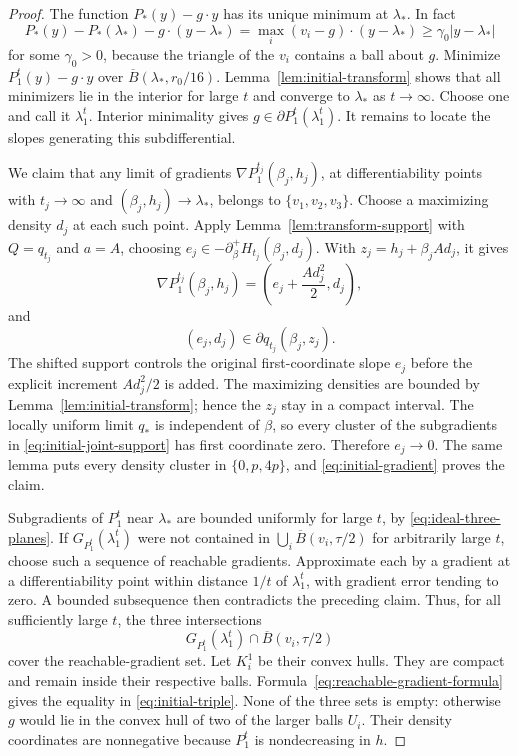 \begin{proof}
The function \(P_*(y)-g\cdot y\) has its unique minimum at
\(\lambda_*\).  In fact
\[
 P_*(y)-P_*(\lambda_*)-g\cdot(y-\lambda_*)
 =\max_i(v_i-g)\cdot(y-\lambda_*)\ge\gamma_0|y-\lambda_*|
\]
for some \(\gamma_0>0\), because the triangle of the \(v_i\)
contains a ball about \(g\).
Minimize \(P_1^t(y)-g\cdot y\) over
\(\overline B(\lambda_*,r_0/16)\).
Lemma~\ref{lem:initial-transform} shows that all minimizers lie in
the interior for large \(t\) and converge to \(\lambda_*\) as
\(t\to\infty\).  Choose one and call it \(\lambda_1^t\).
Interior minimality gives \(g\in\partial P_1^t(\lambda_1^t)\).
It remains to locate the slopes generating this subdifferential.

We claim that any limit of gradients
\(\nabla P_1^{t_j}(\beta_j,h_j)\), at differentiability points with
\(t_j\to\infty\) and \((\beta_j,h_j)\to\lambda_*\), belongs to
\(\{v_1,v_2,v_3\}\).  Choose a maximizing density \(d_j\) at each
such point. Apply Lemma~\ref{lem:transform-support} with $Q=q_{t_j}$
and $a=A$, choosing
$e_j\in-\partial_\beta^+H_{t_j}(\beta_j,d_j)$.
With $z_j=h_j+\beta_jAd_j$, it gives
\begin{equation}\label{eq:initial-gradient}
 \nabla P_1^{t_j}(\beta_j,h_j)
            =\left(e_j+\frac{Ad_j^2}{2},d_j\right),
\end{equation}
and
\begin{equation}\label{eq:initial-joint-support}
 (e_j,d_j)\in\partial q_{t_j}(\beta_j,z_j).
\end{equation}
The shifted support controls the original first-coordinate slope $e_j$
before the explicit increment $Ad_j^2/2$ is added.
The maximizing densities are bounded by
Lemma~\ref{lem:initial-transform}; hence the \(z_j\) stay in a
compact interval.  The locally uniform limit \(q_*\) is independent
of \(\beta\), so every cluster of the subgradients in
\eqref{eq:initial-joint-support} has first coordinate zero.
Therefore \(e_j\to0\).  The same lemma puts every density cluster
in \(\{0,p,4p\}\), and \eqref{eq:initial-gradient} proves the claim.

Subgradients of \(P_1^t\) near \(\lambda_*\) are bounded uniformly
for large \(t\), by \eqref{eq:ideal-three-planes}.
If \(G_{P_1^t}(\lambda_1^t)\) were not contained in
\(\bigcup_i\overline B(v_i,\tau/2)\) for arbitrarily large \(t\),
choose such a sequence of reachable gradients.  Approximate each
by a gradient at a differentiability point within distance \(1/t\)
of \(\lambda_1^t\), with gradient error tending to zero.
A bounded subsequence then contradicts the preceding claim.
Thus, for all sufficiently large \(t\), the three intersections
\[
 G_{P_1^t}(\lambda_1^t)\cap\overline B(v_i,\tau/2)
\]
cover the reachable-gradient set.  Let \(K_i^1\) be their convex
hulls.  They are compact and remain inside their respective balls.
Formula~\eqref{eq:reachable-gradient-formula} gives the equality
in \eqref{eq:initial-triple}.  None of the three sets is empty:
otherwise \(g\) would lie in the convex hull of two of the larger
balls \(U_i\).  Their density coordinates are nonnegative because
\(P_1^t\) is nondecreasing in \(h\).


\end{proof}
